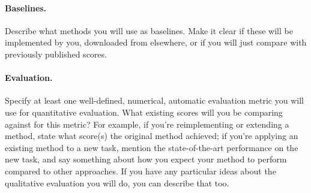 \documentclass{article}
\begin{document}
\paragraph{Baselines.}
Describe what methods you will use as baselines. Make it clear if these will be implemented by you, downloaded from elsewhere, or if you will just compare with previously published scores.

\paragraph{Evaluation.}
Specify at least one well-defined, numerical, automatic evaluation metric you will use for quantitative evaluation. 
What existing scores will you be comparing against for this metric? For example, if you're reimplementing or extending a method, state what score(s) the original method achieved; if you're applying an existing method to a new task, mention the state-of-the-art performance on the new task, and say something about how you expect your method to perform compared to other approaches.
If you have any particular ideas about the qualitative evaluation you will do, you can describe that too.



\end{document}
